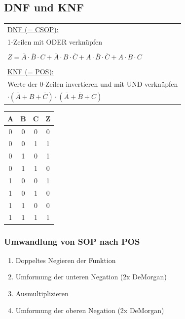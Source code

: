 \documentclass[a4paper,twocolumn,10pt]{article}
\begin{document}
\subsection*{DNF und KNF}
\begin{minipage}[b]{0.3\textwidth}
\begin{tabular}{@{}p{\textwidth}}
	\underline{DNF (= CSOP):}\\
	1-Zeilen mit ODER verknüpfen\\\\
	$Z=\overline{A}\cdot\overline{B}\cdot C+\overline{A}\cdot B\cdot\overline{C}+A\cdot\overline{B}\cdot\overline{C}+A\cdot B\cdot C$ \\\\
	\underline{KNF (= POS):}\\
	Werte der 0-Zeilen invertieren und mit UND verknüpfen
	\begin{tabbing}
	$Z=$ \= $(A+B+C)\cdot(A+\overline{B}+\overline{C})\cdot$ \\
	\> $\cdot(\overline{A}+B+\overline{C})\cdot(\overline{A}+\overline{B}+C)$
	\end{tabbing}
\end{tabular}
\end{minipage}
\hfill
\begin{minipage}[b]{0.16\textwidth}
\begin{tabular}{@{}|c|c|c|c|}
\hline \rowcolor{white} \textbf{A} & \textbf{B} & \textbf{C} & \textbf{Z} \\ 
\hline 0 & 0 & 0 & 0 \\ 
\hline \rowcolor{Gray} 0 & 0 & 1 & 1 \\
\hline \rowcolor{Gray} 0 & 1 & 0 & 1 \\
\hline \rowcolor{white}0 & 1 & 1 & 0 \\
\hline \rowcolor{Gray} 1 & 0 & 0 & 1 \\
\hline \rowcolor{white}1 & 0 & 1 & 0 \\
\hline 1 & 1 & 0 & 0 \\
\hline \rowcolor{Gray} 1 & 1 & 1 & 1 \\
\hline 
\end{tabular}
\end{minipage}

\subsubsection*{Umwandlung von SOP nach POS}
\begin{enumerate}
	\item Doppeltes Negieren der Funktion
	\item Umformung der unteren Negation (2x DeMorgan)
	\item Ausmultiplizieren
	\item Umformung der oberen Negation (2x DeMorgan)
\end{enumerate}
\end{document}
